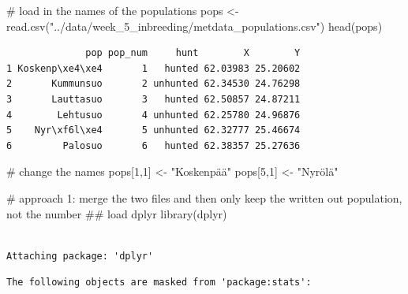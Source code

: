 \documentclass[
  letterpaper,
  DIV=11,
  numbers=noendperiod]{scrreprt}
\newenvironment{Shaded}{}{}
\newcommand{\CommentTok}[1]{\textcolor[rgb]{0.42,0.45,0.49}{#1}}
\newcommand{\DecValTok}[1]{\textcolor[rgb]{0.00,0.36,0.77}{#1}}
\newcommand{\DocumentationTok}[1]{\textcolor[rgb]{0.42,0.45,0.49}{#1}}
\newcommand{\FunctionTok}[1]{\textcolor[rgb]{0.44,0.26,0.76}{#1}}
\newcommand{\NormalTok}[1]{\textcolor[rgb]{0.14,0.16,0.18}{#1}}
\newcommand{\OtherTok}[1]{\textcolor[rgb]{0.44,0.26,0.76}{#1}}
\newcommand{\StringTok}[1]{\textcolor[rgb]{0.01,0.18,0.38}{#1}}
\begin{document}
\begin{tcolorbox}[enhanced jigsaw, arc=.35mm, left=2mm, titlerule=0mm, rightrule=.15mm, colframe=quarto-callout-tip-color-frame, coltitle=black, colback=white, opacityback=0, bottomtitle=1mm, bottomrule=.15mm, colbacktitle=quarto-callout-tip-color!10!white, breakable, title=\textcolor{quarto-callout-tip-color}{\faLightbulb}\hspace{0.5em}{Code and answer}, toptitle=1mm, toprule=.15mm, opacitybacktitle=0.6, leftrule=.75mm]

\begin{Shaded}
\begin{Highlighting}[]
\CommentTok{\# load in the names of the populations}
\NormalTok{pops }\OtherTok{\textless{}{-}} \FunctionTok{read.csv}\NormalTok{(}\StringTok{"../data/week\_5\_inbreeding/metdata\_populations.csv"}\NormalTok{)}
\FunctionTok{head}\NormalTok{(pops)}
\end{Highlighting}
\end{Shaded}

\begin{verbatim}
              pop pop_num     hunt        X        Y
1 Koskenp\xe4\xe4       1   hunted 62.03983 25.20602
2       Kummunsuo       2 unhunted 62.34530 24.76298
3       Lauttasuo       3   hunted 62.50857 24.87211
4        Lehtusuo       4 unhunted 62.25780 24.96876
5    Nyr\xf6l\xe4       5 unhunted 62.32777 25.46674
6         Palosuo       6   hunted 62.38357 25.27636
\end{verbatim}

\begin{Shaded}
\begin{Highlighting}[]
\CommentTok{\# change the names}
\NormalTok{pops[}\DecValTok{1}\NormalTok{,}\DecValTok{1}\NormalTok{] }\OtherTok{\textless{}{-}} \StringTok{"Koskenpää"}
\NormalTok{pops[}\DecValTok{5}\NormalTok{,}\DecValTok{1}\NormalTok{] }\OtherTok{\textless{}{-}} \StringTok{"Nyrölä"}

\CommentTok{\# approach 1: merge the two files and then only keep the written out population, not the number}
\DocumentationTok{\#\# load dplyr}
\FunctionTok{library}\NormalTok{(dplyr)}
\end{Highlighting}
\end{Shaded}

\begin{verbatim}

Attaching package: 'dplyr'
\end{verbatim}

\begin{verbatim}
The following objects are masked from 'package:stats':


\end{verbatim}
\end{tcolorbox}
\end{document}
